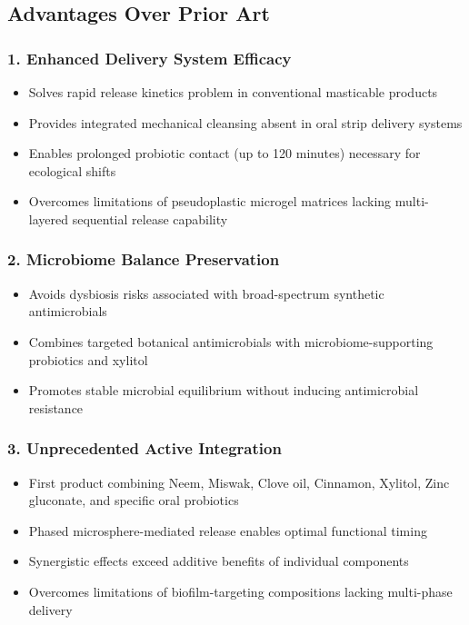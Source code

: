 \documentclass[12pt]{article}
\begin{document}
\subsection*{Advantages Over Prior Art}

\subsubsection*{1. Enhanced Delivery System Efficacy}
\begin{itemize}
    \item Solves rapid release kinetics problem in conventional masticable products
    \item Provides integrated mechanical cleansing absent in oral strip delivery systems 
    \item Enables prolonged probiotic contact (up to 120 minutes) necessary for ecological shifts
    \item Overcomes limitations of pseudoplastic microgel matrices lacking multi-layered sequential release capability 
\end{itemize}

\subsubsection*{2. Microbiome Balance Preservation}
\begin{itemize}
    \item Avoids dysbiosis risks associated with broad-spectrum synthetic antimicrobials 
    \item Combines targeted botanical antimicrobials with microbiome-supporting probiotics and xylitol
    \item Promotes stable microbial equilibrium without inducing antimicrobial resistance
\end{itemize}

\subsubsection*{3. Unprecedented Active Integration}
\begin{itemize}
    \item First product combining Neem, Miswak, Clove oil, Cinnamon, Xylitol, Zinc gluconate, and specific oral probiotics
    \item Phased microsphere-mediated release enables optimal functional timing
    \item Synergistic effects exceed additive benefits of individual components
    \item Overcomes limitations of biofilm-targeting compositions lacking multi-phase delivery 
\end{itemize}
\end{document}
